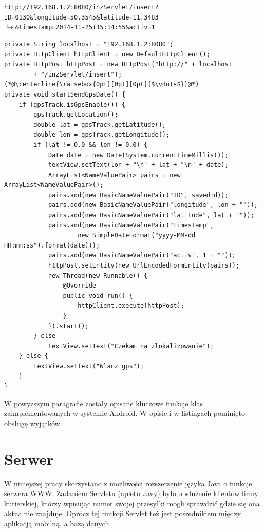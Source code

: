 \documentclass[eng,printmode,oneside]{mgr}
\begin{document}
\begin{flushright}
\texttt{http://192.168.1.2:8080/inzServlet/insert?ID=0130\&longitude=50.3545\&latitude=11.3483
\\$\hookrightarrow$\&timestamp=2014-11-25+15:14:55\&activ=1}
\end{flushright}

\begin{lstlisting}[caption=Metoda startSendGpsDate() klasy
Main.java. Metoda sprawdza stan sygnału GPS i przygotowuje wiadomość do
wysłania na serwer oraz wysyła ją,label=lst:Main.startSendGpsDate.java]
private String localhost = "192.168.1.2:8080";
private HttpClient httpClient = new DefaultHttpClient();
private HttpPost httpPost = new HttpPost("http://" + localhost
		+ "/inzServlet/insert");
(*@\centerline{\raisebox{0pt}[0pt][0pt]{$\vdots$}}@*)
private void startSendGpsDate() {
	if (gpsTrack.isGpsEnable()) {
		gpsTrack.getLocation();
		double lat = gpsTrack.getLatitude();
		double lon = gpsTrack.getLongitude();
		if (lat != 0.0 && lon != 0.0) {
			Date date = new Date(System.currentTimeMillis());
			textView.setText(lon + "\n" + lat + "\n" + date);
			ArrayList<NameValuePair> pairs = new ArrayList<NameValuePair>();
			pairs.add(new BasicNameValuePair("ID", savedId));
			pairs.add(new BasicNameValuePair("longitude", lon + ""));
			pairs.add(new BasicNameValuePair("latitude", lat + ""));
			pairs.add(new BasicNameValuePair("timestamp",
					new SimpleDateFormat("yyyy-MM-dd HH:mm:ss").format(date)));
			pairs.add(new BasicNameValuePair("activ", 1 + ""));
			httpPost.setEntity(new UrlEncodedFormEntity(pairs));
			new Thread(new Runnable() {
				@Override
				public void run() {
					httpClient.execute(httpPost);
				}
			}).start();
		} else
			textView.setText("Czekam na zlokalizowanie");
	} else {
		textView.setText("Wlacz gps");
	}
}
\end{lstlisting}

W powyższym paragrafie zostały opisane kluczowe funkcje klas zaimplementowanych
w systemie Android. W opisie i w listingach pominięto obsługę wyjątków. 

\section{Serwer}

W niniejszej pracy skorzystano z możliwości rozszerzenie języka Java o funkcje
serwera WWW. Zadaniem Servletu (apletu Javy) było obsłużenie klientów firmy
kurierskiej, którzy wpisując numer swojej przesyłki mogli sprawdzić gdzie się
ona aktualnie znajduje. Oprócz tej funkcji Servlet też jest pośrednikiem
między aplikacją mobilną, a bazą danych.
\end{document}

